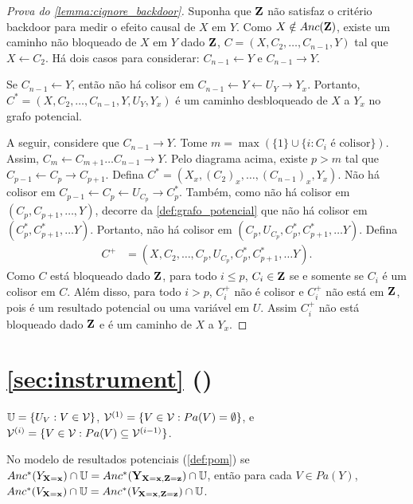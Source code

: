 \begin{proof}[Prova do \cref{lemma:cignore_backdoor}]
 Suponha que ${\mathbf{Z}}$ não satisfaz 
 o critério backdoor para medir o efeito causal de $X$ em $Y$.
 Como $X \notin Anc({\mathbf{Z}})$, existe 
 um caminho não bloqueado de $X$ em $Y$ dado ${\mathbf{Z}}$,
 $C = (X, C_2, \ldots, C_{n-1}, Y)$ tal que
 $X \leftarrow C_2$.
 Há dois casos para considerar:
 $C_{n-1} \leftarrow Y$ e $C_{n-1} \rightarrow Y$.
 
 Se $C_{n-1} \leftarrow Y$, então
 não há colisor em 
 $C_{n-1} \leftarrow Y \leftarrow U_Y \rightarrow Y_x$.
 Portanto, $C^* = (X, C_2, \ldots, C_{n-1}, Y, U_Y, Y_x)$ é
 um caminho desbloqueado de $X$ a $Y_x$ no grafo potencial.
 
 A seguir, considere que $C_{n-1} \rightarrow Y$.
 Tome $m = \max(\{1\} \cup \{i: C_i \text{ é colisor} \})$. 
 Assim, $C_m \leftarrow C_{m+1} \ldots C_{n-1} \rightarrow Y$.
 Pelo diagrama acima, existe $p > m$ tal que 
 $C_{p-1} \leftarrow C_p \rightarrow C_{p+1}$.
 Defina $C^* = (X_x, (C_2)_x, \ldots, (C_{n-1})_x, Y_x)$.
 Não há colisor em 
 $C_{p-1} \leftarrow C_p \leftarrow U_{C_p} \rightarrow C^*_p$.
 Também, como não há colisor em $(C_p, C_{p+1}, \ldots, Y)$,
 decorre da \cref{def:grafo_potencial} que
 não há colisor em $(C^*_p, C^*_{p+1}, \ldots Y)$.
 Portanto, não há colisor em
 $(C_p, U_{C_p}, C^*_p, C^*_{p+1}, \ldots Y)$.
 Defina 
 \begin{align*}
  C^+ &= (X, C_2, \ldots, C_p, U_{C_p}, C^*_p, C^*_{p+1}, \ldots Y).
 \end{align*}
 Como $C$ está bloqueado dado ${\mathbf{Z}}$,
 para todo $i \leq p$, $C_i \in {\mathbf{Z}}$ 
 se e somente se $C_i$ é um colisor em $C$.
 Além disso, para todo $i > p$,
 $C^+_i$ não é colisor e 
 $C^+_i$ não está em ${\mathbf{Z}}$, pois
 é um resultado potencial ou uma variável em $U$.
 Assim $C^+_i$ não está bloqueado dado ${\mathbf{Z}}$ e
 é um caminho de $X$ a $Y_x$.
\end{proof}

\section{\cref{sec:instrument} ()}

\begin{definition}
 \label{def:pom_partition}
 ${\mathbb U} = \{U_V: V \in {\mathcal V}\}$,
 ${\mathcal V}^{(1)} = \{V \in {\mathcal V}: Pa(V) = \emptyset\}$, e
 ${\mathcal V}^{(i)} = \{V \in {\mathcal V}: Pa(V) \subseteq {\mathcal V}^{(i-1)}\}$.
\end{definition}

\begin{lemma}
 \label{lemma:pom_anc}
 No modelo de resultados potenciais (\cref{def:pom})
 se $Anc^*(Y_{{\mathbf{X}}={\mathbf{x}}}) \cap {\mathbb U} = Anc^*({\mathbf{Y}}_{{\mathbf{X}}={\mathbf{x}},{\mathbf{Z}}={\mathbf{z}}}) \cap {\mathbb U}$,
 então para cada $V \in Pa(Y)$,
 $Anc^*(V_{{\mathbf{X}}={\mathbf{x}}}) \cap {\mathbb U} = Anc^*(V_{{\mathbf{X}}={\mathbf{x}},{\mathbf{Z}}={\mathbf{z}}}) \cap {\mathbb U}$.
\end{lemma}

